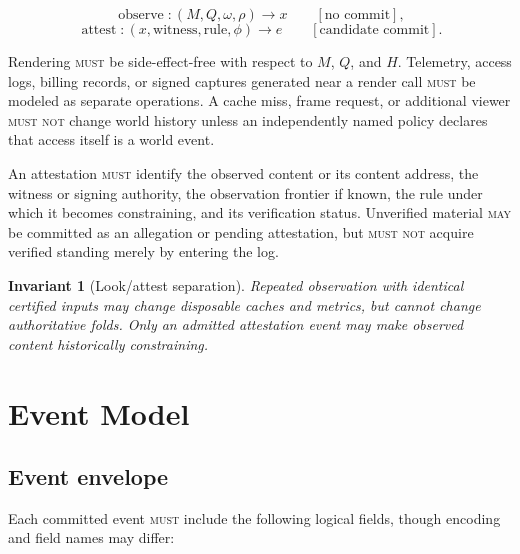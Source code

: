 \documentclass[11pt]{article}
\newtheorem{invariant}{Invariant}
\newcommand{\MUST}{\textsc{must}}
\newcommand{\MUSTNOT}{\textsc{must not}}
\newcommand{\MAY}{\textsc{may}}
\begin{document}
\[
\operatorname{observe}: (M,Q,\omega,\rho)\rightarrow x \qquad [\text{no commit}],
\]
\[
\operatorname{attest}: (x,\text{witness},\text{rule},\phi)\rightarrow e \qquad [\text{candidate commit}].
\]

Rendering \MUST{} be side-effect-free with respect to $M$, $Q$, and $H$. Telemetry, access logs, billing records, or signed captures generated near a render call \MUST{} be modeled as separate operations. A cache miss, frame request, or additional viewer \MUSTNOT{} change world history unless an independently named policy declares that access itself is a world event.

An attestation \MUST{} identify the observed content or its content address, the witness or signing authority, the observation frontier if known, the rule under which it becomes constraining, and its verification status. Unverified material \MAY{} be committed as an allegation or pending attestation, but \MUSTNOT{} acquire verified standing merely by entering the log.

\begin{invariant}[Look/attest separation]
Repeated observation with identical certified inputs may change disposable caches and metrics, but cannot change authoritative folds. Only an admitted attestation event may make observed content historically constraining.
\end{invariant}

\section{Event Model}
\label{sec:event-model-section}

\subsection{Event envelope}

Each committed event \MUST{} include the following logical fields, though encoding and field names may differ:
\end{document}
